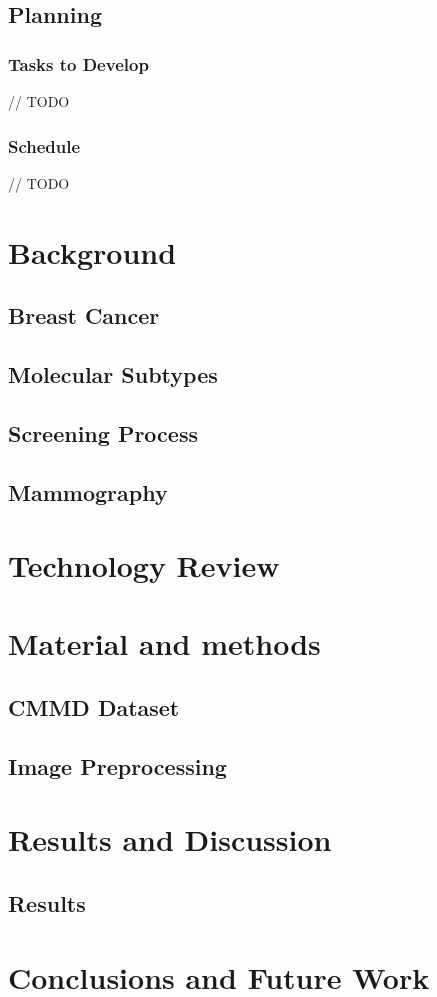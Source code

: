 \documentclass[a4paper,10pt]{book}
\begin{document}
\section{Planning}

\subsection{Tasks to Develop}

// TODO

\subsection{Schedule}

// TODO


\chapter{Background}
\section{Breast Cancer}
\section{Molecular Subtypes}
\section{Screening Process}
\section{Mammography}

\chapter{Technology Review}

\chapter{Material and methods}
\section{CMMD Dataset}
\section{Image Preprocessing}

\chapter{Results and Discussion}
\section{Results}

\chapter{Conclusions and Future Work}

\backmatter
{}


\end{document}
